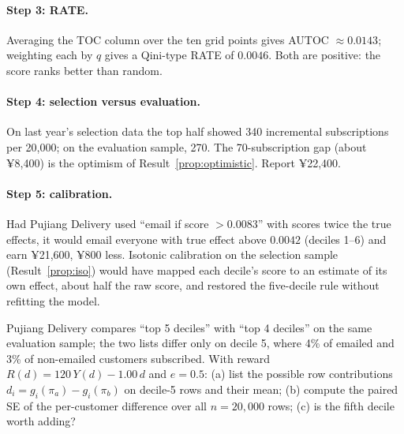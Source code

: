 \documentclass[11pt]{article}
\begin{document}
\paragraph{Step 3: RATE.} Averaging the TOC column over the ten grid points gives AUTOC $\approx 0.0143$; weighting each by
$q$ gives a Qini-type RATE of $0.0046$. Both are positive: the score ranks better than random.

\paragraph{Step 4: selection versus evaluation.} On last year's selection data the top half showed 340 incremental
subscriptions per 20{,}000; on the evaluation sample, 270. The 70-subscription gap (about ¥8{,}400) is the optimism of
Result~\ref{prop:optimistic}. Report ¥22{,}400.

\paragraph{Step 5: calibration.} Had Pujiang Delivery used ``email if score $> 0.0083$'' with scores twice the true effects, it
would email everyone with true effect above $0.0042$ (deciles 1--6) and earn ¥21{,}600, ¥800 less. Isotonic calibration on
the selection sample (Result~\ref{prop:iso}) would have mapped each decile's score to an estimate of its own effect, about
half the raw score, and restored the five-decile rule without refitting the model.

\begin{exercise}[computation]
Pujiang Delivery compares ``top 5 deciles'' with ``top 4 deciles'' on the same evaluation sample; the two lists differ only on
decile 5, where 4\% of emailed and 3\% of non-emailed customers subscribed. With reward $R(d) = 120\,Y(d) - 1.00\,d$ and
$e = 0.5$: (a) list the possible row contributions $d_i = g_i(\pi_a) - g_i(\pi_b)$ on decile-5 rows and their mean;
(b) compute the paired SE of the per-customer difference over all $n = 20{,}000$ rows; (c) is the fifth decile worth
adding?
\end{exercise}
\end{document}
